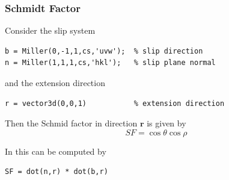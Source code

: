 \documentclass[compress]{beamer}
\begin{document}
\begin{frame}[fragile]
  \frametitle{Schmidt Factor}

  Consider the slip system
  \begin{lstlisting}[style=input]
b = Miller(0,-1,1,cs,'uvw');  % slip direction
n = Miller(1,1,1,cs,'hkl');   % slip plane normal
\end{lstlisting}

\pause

and the extension direction
  \begin{lstlisting}[style=input]
r = vector3d(0,0,1)           % extension direction
\end{lstlisting}

\pause

\medskip

Then the Schmid factor in direction $\mathbf r$ is given by
\begin{equation*}
  SF = \cos \theta \cos \rho
\end{equation*}

\pause

In \MTEX this can be computed by
  \begin{lstlisting}[style=input]
SF = dot(n,r) * dot(b,r)
  \end{lstlisting}

\end{frame}
\end{document}
